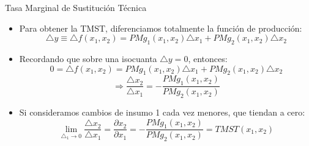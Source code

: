 \documentclass{beamer}
\theoremstyle{definition}
\begin{document}
\begin{frame}{Tasa Marginal de Sustitución Técnica}
	\begin{itemize}
			\item Para obtener la TMST,  diferenciamos totalmente la funci\'on de producci\'on:
		$$\triangle y\equiv\triangle f(x_{1},x_{2})=PMg_{1}(x_1,x_2)\triangle x_{1}+PMg_{2}(x_1,x_2)\triangle x_{2}$$
		\item Recordando que sobre una isocuanta $\triangle y=0$, entonces:
		$$0=\triangle f(x_{1},x_{2})=PMg_{1}(x_1,x_2)\triangle x_{1}+PMg_{2}(x_1,x_2)\triangle x_{2}$$
		$$\Longrightarrow \frac{\triangle x_{2}}{\triangle x_{1}}=-\frac{PMg_{1}(x_1,x_2)}{PMg_{2}(x_1,x_2)}$$
		\item Si consideramos cambios de insumo 1 cada vez menores, que tiendan a cero:
		$$\lim_{\triangle_1 \rightarrow 0} \frac{\triangle x_{2}}{\triangle x_{1}}=\frac{\partial x_{2}}{\partial x_{1}}=-\frac{PMg_{1}(x_1,x_2)}{PMg_{2}(x_1,x_2)}=TMST(x_1,x_2)$$
	\end{itemize}	
\end{frame}			
\end{document}
